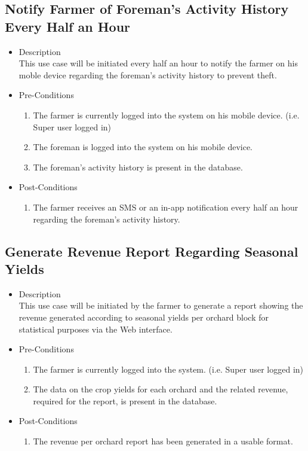 \documentclass[11pt,fleqn]{book} %
\begin{document}
	\subsection{Notify Farmer of Foreman’s Activity History Every Half an Hour}
	\begin{itemize}
		\item Description\\
		This use case will be initiated every half an hour to notify the farmer on his moble device regarding the foreman’s activity history to prevent theft.
		\item Pre-Conditions
		\begin{enumerate}
			\item The farmer is currently logged into the system on his mobile device. (i.e. Super user logged in)
			\item The foreman is logged into the system on his mobile device.
			\item The foreman’s activity history is present in the database.					
		\end{enumerate}
		\item Post-Conditions
		\begin{enumerate}
			\item The farmer receives an SMS or an in-app notification every half an hour regarding the foreman’s activity history.
		\end{enumerate}
	\end{itemize}
	
	\subsection{Generate Revenue Report Regarding Seasonal Yields}
	\begin{itemize}
		\item Description\\
		This use case will be initiated by the farmer to generate a report showing the revenue generated according to seasonal yields per orchard block for statistical purposes via the Web interface.
		\item Pre-Conditions
		\begin{enumerate}
			\item The farmer is currently logged into the system. (i.e. Super user logged in)
			\item The data on the crop yields for each orchard and the related revenue, required for the report, is present in the database.	
		\end{enumerate}
		\item Post-Conditions
		\begin{enumerate}
			\item The revenue per orchard report has been generated in a usable format.
		\end{enumerate}
	\end{itemize}
	
\end{document}
